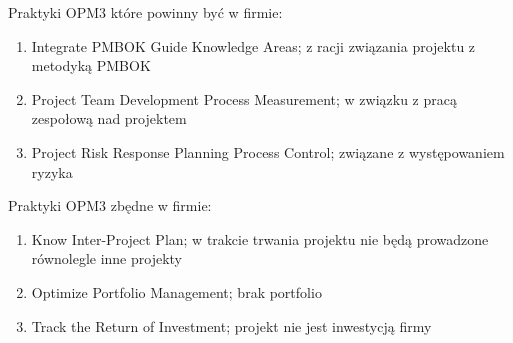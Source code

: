 Praktyki OPM3 które powinny być w firmie:

\begin{enumerate}

\item Integrate PMBOK Guide Knowledge Areas; z racji związania projektu z metodyką PMBOK

\item Project Team Development Process Measurement; w związku z pracą zespołową nad projektem

\item Project Risk Response Planning Process Control; związane z występowaniem ryzyka

\end{enumerate}

Praktyki OPM3 zbędne w firmie:

\begin{enumerate}

\item Know Inter-Project Plan; w trakcie trwania projektu nie będą prowadzone równolegle inne projekty

\item Optimize Portfolio Management; brak portfolio

\item Track the Return of Investment; projekt nie jest inwestycją firmy

\end{enumerate}